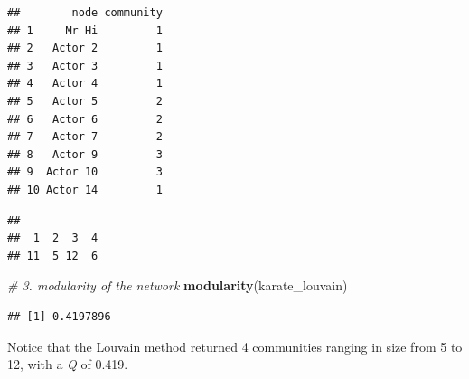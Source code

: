 \documentclass[
]{book}
\newenvironment{Shaded}{\begin{snugshade}}{\end{snugshade}}
\newcommand{\AttributeTok}[1]{\textcolor[rgb]{0.13,0.29,0.53}{#1}}
\newcommand{\CommentTok}[1]{\textcolor[rgb]{0.56,0.35,0.01}{\textit{#1}}}
\newcommand{\DecValTok}[1]{\textcolor[rgb]{0.00,0.00,0.81}{#1}}
\newcommand{\FunctionTok}[1]{\textcolor[rgb]{0.13,0.29,0.53}{\textbf{#1}}}
\newcommand{\NormalTok}[1]{#1}
\newcommand{\OtherTok}[1]{\textcolor[rgb]{0.56,0.35,0.01}{#1}}
\newcommand{\SpecialCharTok}[1]{\textcolor[rgb]{0.81,0.36,0.00}{\textbf{#1}}}
\begin{document}
\begin{Shaded}
\end{Shaded}

\begin{verbatim}
##        node community
## 1     Mr Hi         1
## 2   Actor 2         1
## 3   Actor 3         1
## 4   Actor 4         1
## 5   Actor 5         2
## 6   Actor 6         2
## 7   Actor 7         2
## 8   Actor 9         3
## 9  Actor 10         3
## 10 Actor 14         1
\end{verbatim}

\begin{Shaded}
\end{Shaded}

\begin{verbatim}
## 
##  1  2  3  4 
## 11  5 12  6
\end{verbatim}

\begin{Shaded}
\begin{Highlighting}[]
\CommentTok{\# 3. modularity of the network }
\FunctionTok{modularity}\NormalTok{(karate\_louvain)  }
\end{Highlighting}
\end{Shaded}

\begin{verbatim}
## [1] 0.4197896
\end{verbatim}

Notice that the Louvain method returned 4 communities ranging in size from 5 to 12, with a \emph{Q} of 0.419.
\end{document}
